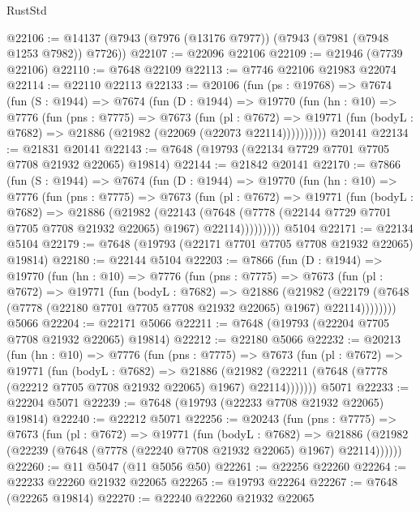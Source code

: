 \begin{lexlean}{RustStd}
\begin{coremodule}
@22106 := @14137 (@7943 (@7976 (@13176 @7977)) (@7943 (@7981 (@7948 @1253 @7982)) @7726))
@22107 := @22096 @22106
@22109 := @21946 (@7739 @22106)
@22110 := @7648 @22109
@22113 := @7746 @22106 @21983 @22074
@22114 := @22110 @22113
@22133 := @20106
    (fun (ps : @19768) =>
    @7674
      (fun (S : @1944) =>
      @7674
        (fun (D : @1944) =>
        @19770
          (fun (hn : @10) =>
          @7776
            (fun (pns : @7775) =>
            @7673
              (fun (pl : @7672) =>
              @19771 (fun (bodyL : @7682) => @21886 (@21982 (@22069 (@22073 @22114))))))))))
    @20141
@22134 := @21831 @20141
@22143 := @7648 (@19793 (@22134 @7729 @7701 @7705 @7708 @21932 @22065) @19814)
@22144 := @21842 @20141
@22170 := @7866
    (fun (S : @1944) =>
    @7674
      (fun (D : @1944) =>
      @19770
        (fun (hn : @10) =>
        @7776
          (fun (pns : @7775) =>
          @7673
            (fun (pl : @7672) =>
            @19771
              (fun (bodyL : @7682) =>
              @21886
                (@21982
                  (@22143
                    (@7648
                      (@7778 (@22144 @7729 @7701 @7705 @7708 @21932 @22065) @1967)
                      @22114)))))))))
    @5104
@22171 := @22134 @5104
@22179 := @7648 (@19793 (@22171 @7701 @7705 @7708 @21932 @22065) @19814)
@22180 := @22144 @5104
@22203 := @7866
    (fun (D : @1944) =>
    @19770
      (fun (hn : @10) =>
      @7776
        (fun (pns : @7775) =>
        @7673
          (fun (pl : @7672) =>
          @19771
            (fun (bodyL : @7682) =>
            @21886
              (@21982
                (@22179 (@7648 (@7778 (@22180 @7701 @7705 @7708 @21932 @22065) @1967) @22114))))))))
    @5066
@22204 := @22171 @5066
@22211 := @7648 (@19793 (@22204 @7705 @7708 @21932 @22065) @19814)
@22212 := @22180 @5066
@22232 := @20213
    (fun (hn : @10) =>
    @7776
      (fun (pns : @7775) =>
      @7673
        (fun (pl : @7672) =>
        @19771
          (fun (bodyL : @7682) =>
          @21886
            (@21982 (@22211 (@7648 (@7778 (@22212 @7705 @7708 @21932 @22065) @1967) @22114)))))))
    @5071
@22233 := @22204 @5071
@22239 := @7648 (@19793 (@22233 @7708 @21932 @22065) @19814)
@22240 := @22212 @5071
@22256 := @20243
    (fun (pns : @7775) =>
    @7673
      (fun (pl : @7672) =>
      @19771
        (fun (bodyL : @7682) =>
        @21886 (@21982 (@22239 (@7648 (@7778 (@22240 @7708 @21932 @22065) @1967) @22114))))))
@22260 := @11 @5047 (@11 @5056 @50)
@22261 := @22256 @22260
@22264 := @22233 @22260 @21932 @22065
@22265 := @19793 @22264
@22267 := @7648 (@22265 @19814)
@22270 := @22240 @22260 @21932 @22065

\end{coremodule}
\end{lexlean}
